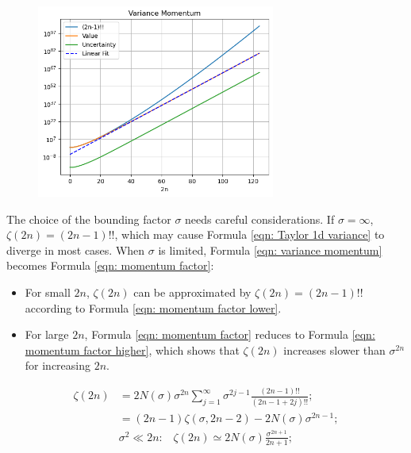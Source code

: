 \documentclass[twoside]{article}
\numberwithin{equation}{section}
\newcommand{\eqspace}{\;\;\;}
\begin{document}
\begin{figure}
\centering
\includegraphics[height=2.5in]{Variance_Momentum.png} 
\label{fig: Variance_Momentum}
\end{figure}



The choice of the bounding factor $\sigma$ needs careful considerations.
If $\sigma = \infty$, $\zeta(2n) = (2n - 1)!!$, which may cause Formula \eqref{eqn: Taylor 1d variance} to diverge in most cases.
When $\sigma$ is limited, Formula \eqref{eqn: variance momentum} becomes Formula \eqref{eqn: momentum factor}:
\begin{itemize}
\item For small $2n$, $\zeta(2n)$ can be approximated by $\zeta(2n) = (2n-1)!!$ according to Formula \eqref{eqn: momentum factor lower}.  

\item For large $2n$, Formula \eqref{eqn: momentum factor} reduces to Formula \eqref{eqn: momentum factor higher}, which shows that $\zeta(2n)$ increases slower than $\sigma^{2n}$ for increasing $2n$.

\end{itemize}
\begin{align}
\label{eqn: momentum factor} 
\zeta(2n) &= 2 N(\sigma) \sigma^{2n} \sum_{j=1}^{\infty} \sigma^{2j-1} \frac{(2n - 1)!!}{(2n-1 + 2j)!!}; \\
\label{eqn: momentum factor lower} 
 &= (2n - 1) \zeta(\sigma, 2n - 2) - 2 N(\sigma) \sigma^{2n - 1}; \\
\label{eqn: momentum factor higher} 
&\sigma^2 \ll 2n:\eqspace \zeta(2n) \simeq 2 N(\sigma) \frac{\sigma^{2n+1}}{2n+1};
\end{align}
\end{document}

